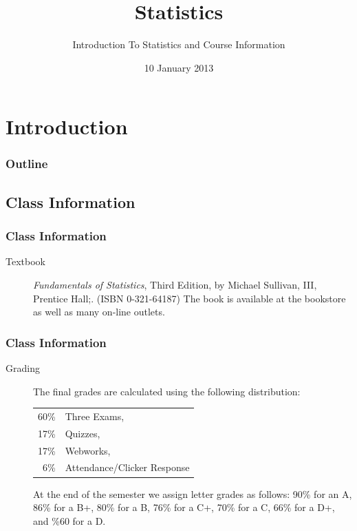 
\section{Introduction}

\title{Statistics}
\subtitle{Introduction To Statistics and Course Information}

\date{10 January 2013}

\begin{frame}
  \titlepage
\end{frame}

\begin{frame}
  \frametitle{Outline}
  \tableofcontents[hideothersubsections,sectionstyle=show/hide]
\end{frame}


\subsection{Class Information}


\begin{frame}
  \frametitle{Class Information}

\begin{description}
\item[Textbook] {\em Fundamentals of Statistics}, Third Edition, by
  Michael Sullivan, III, Prentice Hall;. (ISBN 0-321-64187) The book
  is available at the bookstore as well as many on-line outlets.

\end{description}

\end{frame}


\begin{frame}
  \frametitle{Class Information}

\begin{description}
\item[Grading] %
  
  The final grades are calculated using the following distribution:
    \begin{tabular}[t]{rl}
      60\% & Three Exams, \\
      17\% & Quizzes, \\
      17\% & Webworks, \\
      6\%  & Attendance/Clicker Response \\
    \end{tabular}
  
    At the end of the semester we assign letter grades as follows:
    90\% for an A, 86\% for a B+, 80\% for a B, 76\% for a C+, 70\%
    for a C, 66\% for a D+, and \%60 for a D.
\end{description}

\end{frame}



